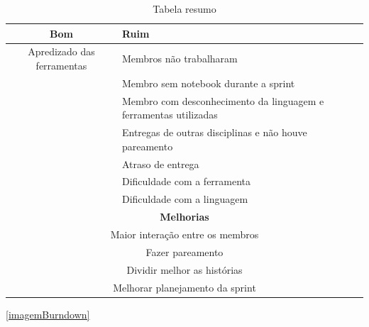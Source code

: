 \begin{table}[H]
    \centering
    \caption{Tabela resumo}
    \label{tabelaResumoSprint}
    \begin{tabular}{|c|p{10cm}|}
        \hline
        \textbf{Bom} & \textbf{Ruim} \\
        \hline
        Apredizado das ferramentas  &  Membros não trabalharam \\
        & Membro sem notebook durante a sprint \\
        & Membro com desconhecimento da linguagem e ferramentas utilizadas\\
        &  Entregas de outras disciplinas e não houve pareamento \\
        &  Atraso de entrega\\
        &  Dificuldade com a ferramenta\\
        & Dificuldade com a linguagem\\
        \hline
        \multicolumn{2}{|c|}{\textbf{Melhorias}}\\
        \hline
        \multicolumn{2}{|c|}{Maior interação entre os membros} \\
        \multicolumn{2}{|c|}{Fazer pareamento} \\
        \multicolumn{2}{|c|}{Dividir melhor as histórias} \\
        \multicolumn{2}{|c|}{Melhorar planejamento da sprint} \\
        \hline
    \end{tabular}
\end{table}


\ref{imagemBurndown}
